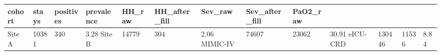 \begin{tabular}{lllllllll}
\hline
cohort & stays & positives & prevalence & HH\_raw & HH\_after\_fill & Sev\_raw & Sev\_after\_fill & PaO2\_raw \\
\hline
Site A & 10381 & 340 & 3.28%
Site B & 14779 & 304 & 2.06%
MIMIC-IV & 74607 & 23062 & 30.91%
eICU-CRD & 130446 & 11536 & 8.84%
\hline
\end{tabular}
